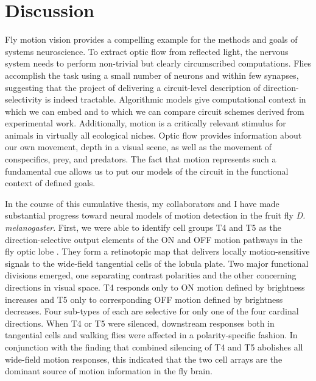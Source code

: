 \chapter{Discussion}
\label{chp:discussion}


Fly motion vision provides a compelling example for the methods and goals of systems neuroscience. To extract optic flow from reflected light, the nervous system needs to perform non-trivial but clearly circumscribed computations. Flies accomplish the task using a small number of neurons and within few synapses, suggesting that the project of delivering a circuit-level description of direction-selectivity is indeed tractable. Algorithmic models give computational context in which we can embed and to which we can compare circuit schemes derived from experimental work. Additionally, motion is a critically relevant stimulus for animals in virtually all ecological niches. Optic flow provides information about our own movement, depth in a visual scene, as well as the movement of conspecifics, prey, and predators. The fact that motion represents such a fundamental cue allows us to put our models of the circuit in the functional context of defined goals.

In the course of this cumulative thesis, my collaborators and I have made substantial progress toward neural models of motion detection in the fruit fly \textit{D. melanogaster}. First, we were able to identify cell groups T4 and T5 as the direction-selective output elements of the ON and OFF motion pathways in the fly optic lobe \citep{Maisak:2013kk}. They form a retinotopic map that delivers locally motion-sensitive signals to the wide-field tangential cells of the lobula plate. Two major functional divisions emerged, one separating contrast polarities and the other concerning directions in visual space. T4 responds only to ON motion defined by brightness increases and T5 only to corresponding OFF motion defined by brightness decreases. Four sub-types of each are selective for only one of the four cardinal directions. When T4 or T5 were silenced, downstream responses both in tangential cells and walking flies were affected in a polarity-specific fashion. In conjunction with the finding that combined silencing of T4 and T5 abolishes all wide-field motion responses, this indicated that the two cell arrays are the dominant source of motion information in the fly brain.

